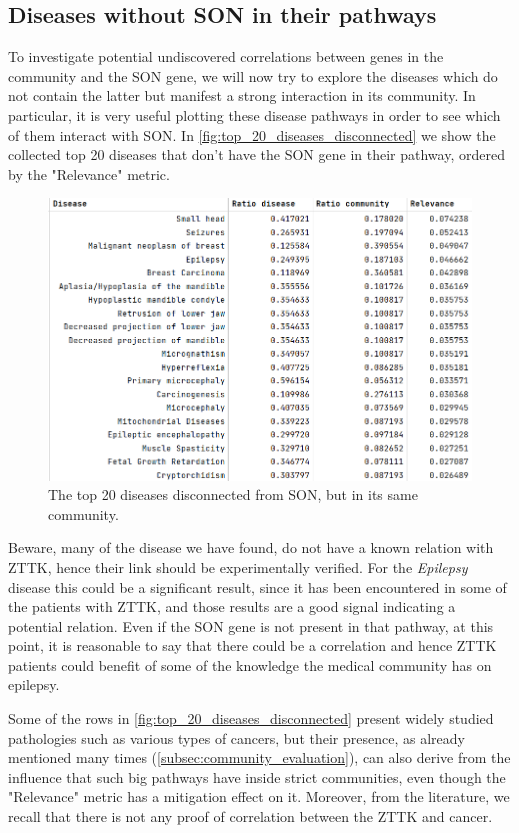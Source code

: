 \subsection{Diseases without SON in their pathways}\label{subsec:diseases_no_son}
To investigate potential undiscovered correlations between genes in the community and the SON gene, we will now try to explore the diseases which do not contain the latter but manifest a strong interaction in its community. In particular, it is very useful plotting these disease pathways in order to see which of them interact with SON. In \autoref{fig:top_20_diseases_disconnected} we show the collected top 20 diseases that don't have the SON gene in their pathway, ordered by the "Relevance" metric.
\begin{figure}[H]
    \centering
    \includegraphics[width=0.8\linewidth]{images/top20_diseases_disconnected.png}
    \caption{The top 20 diseases disconnected from SON, but in its same community.}
    \label{fig:top_20_diseases_disconnected}
\end{figure}
Beware, many of the disease we have found, do not have a known relation with ZTTK, hence their link should be experimentally verified. For the \textit{Epilepsy} disease this could be a significant result, since it has been encountered in some of the patients with ZTTK, and those results are a good signal indicating a potential relation. Even if the SON gene is not present in that pathway, at this point, it is reasonable to say that there could be a correlation and hence ZTTK patients could benefit of some of the knowledge the medical community has on epilepsy.
\vspace{3mm}

Some of the rows in \autoref{fig:top_20_diseases_disconnected} present widely studied pathologies such as various types of cancers, but their presence, as already mentioned many times (\autoref{subsec:community_evaluation}), can also derive from the influence that such big pathways have inside strict communities, even though the "Relevance" metric has a mitigation effect on it. Moreover, from the literature, we recall that there is not any proof of correlation between the ZTTK and cancer.
\vspace{3mm}

